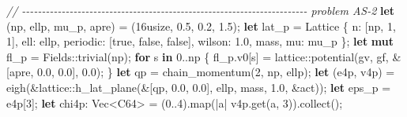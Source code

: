 \documentclass[
  10pt,
]{article}
\newenvironment{Shaded}{}{}
\newcommand{\CommentTok}[1]{\textcolor[rgb]{0.38,0.63,0.69}{\textit{#1}}}
\newcommand{\ConstantTok}[1]{\textcolor[rgb]{0.53,0.00,0.00}{#1}}
\newcommand{\ControlFlowTok}[1]{\textcolor[rgb]{0.00,0.44,0.13}{\textbf{#1}}}
\newcommand{\DataTypeTok}[1]{\textcolor[rgb]{0.56,0.13,0.00}{#1}}
\newcommand{\DecValTok}[1]{\textcolor[rgb]{0.25,0.63,0.44}{#1}}
\newcommand{\KeywordTok}[1]{\textcolor[rgb]{0.00,0.44,0.13}{\textbf{#1}}}
\newcommand{\NormalTok}[1]{#1}
\newcommand{\OperatorTok}[1]{\textcolor[rgb]{0.40,0.40,0.40}{#1}}
\newcommand{\PreprocessorTok}[1]{\textcolor[rgb]{0.74,0.48,0.00}{#1}}
\begin{document}
\begin{Shaded}
\begin{Highlighting}[]
    \CommentTok{// {-}{-}{-}{-}{-}{-}{-}{-}{-}{-}{-}{-}{-}{-}{-}{-}{-}{-}{-}{-}{-}{-}{-}{-}{-}{-}{-}{-}{-}{-}{-}{-}{-}{-}{-}{-}{-}{-}{-}{-}{-}{-}{-}{-}{-}{-}{-}{-}{-}{-}{-}{-}{-}{-}{-}{-}{-}{-}{-}{-}{-}{-}{-}{-}{-}{-}{-}{-}{-}{-}{-}{-} problem AS{-}2}
    \KeywordTok{let}\NormalTok{ (np}\OperatorTok{,}\NormalTok{ ellp}\OperatorTok{,}\NormalTok{ mu\_p}\OperatorTok{,}\NormalTok{ apre) }\OperatorTok{=}\NormalTok{ (}\DecValTok{16usize}\OperatorTok{,} \DecValTok{0.5}\OperatorTok{,} \DecValTok{0.2}\OperatorTok{,} \DecValTok{1.5}\NormalTok{)}\OperatorTok{;}
    \KeywordTok{let}\NormalTok{ lat\_p }\OperatorTok{=}\NormalTok{ Lattice }\OperatorTok{\{}\NormalTok{ n}\OperatorTok{:}\NormalTok{ [np}\OperatorTok{,} \DecValTok{1}\OperatorTok{,} \DecValTok{1}\NormalTok{]}\OperatorTok{,}\NormalTok{ ell}\OperatorTok{:}\NormalTok{ ellp}\OperatorTok{,}\NormalTok{ periodic}\OperatorTok{:}\NormalTok{ [}\ConstantTok{true}\OperatorTok{,} \ConstantTok{false}\OperatorTok{,} \ConstantTok{false}\NormalTok{]}\OperatorTok{,}\NormalTok{ wilson}\OperatorTok{:} \DecValTok{1.0}\OperatorTok{,}\NormalTok{ mass}\OperatorTok{,}\NormalTok{ mu}\OperatorTok{:}\NormalTok{ mu\_p }\OperatorTok{\};}
    \KeywordTok{let} \KeywordTok{mut}\NormalTok{ fl\_p }\OperatorTok{=} \PreprocessorTok{Fields::}\NormalTok{trivial(np)}\OperatorTok{;}
    \ControlFlowTok{for}\NormalTok{ s }\KeywordTok{in} \DecValTok{0}\OperatorTok{..}\NormalTok{np }\OperatorTok{\{}
\NormalTok{        fl\_p}\OperatorTok{.}\NormalTok{v0[s] }\OperatorTok{=} \PreprocessorTok{lattice::}\NormalTok{potential(gv}\OperatorTok{,}\NormalTok{ gf}\OperatorTok{,} \OperatorTok{\&}\NormalTok{[apre}\OperatorTok{,} \DecValTok{0.0}\OperatorTok{,} \DecValTok{0.0}\NormalTok{]}\OperatorTok{,} \DecValTok{0.0}\NormalTok{)}\OperatorTok{;}
    \OperatorTok{\}}
    \KeywordTok{let}\NormalTok{ qp }\OperatorTok{=}\NormalTok{ chain\_momentum(}\DecValTok{2}\OperatorTok{,}\NormalTok{ np}\OperatorTok{,}\NormalTok{ ellp)}\OperatorTok{;}
    \KeywordTok{let}\NormalTok{ (e4p}\OperatorTok{,}\NormalTok{ v4p) }\OperatorTok{=}\NormalTok{ eigh(}\OperatorTok{\&}\PreprocessorTok{lattice::}\NormalTok{h\_lat\_plane(}\OperatorTok{\&}\NormalTok{[qp}\OperatorTok{,} \DecValTok{0.0}\OperatorTok{,} \DecValTok{0.0}\NormalTok{]}\OperatorTok{,}\NormalTok{ ellp}\OperatorTok{,}\NormalTok{ mass}\OperatorTok{,} \DecValTok{1.0}\OperatorTok{,} \OperatorTok{\&}\NormalTok{act))}\OperatorTok{;}
    \KeywordTok{let}\NormalTok{ eps\_p }\OperatorTok{=}\NormalTok{ e4p[}\DecValTok{3}\NormalTok{]}\OperatorTok{;}
    \KeywordTok{let}\NormalTok{ chi4p}\OperatorTok{:} \DataTypeTok{Vec}\OperatorTok{\textless{}}\NormalTok{C64}\OperatorTok{\textgreater{}} \OperatorTok{=}\NormalTok{ (}\DecValTok{0}\OperatorTok{..}\DecValTok{4}\NormalTok{)}\OperatorTok{.}\NormalTok{map(}\OperatorTok{|}\NormalTok{a}\OperatorTok{|}\NormalTok{ v4p}\OperatorTok{.}\NormalTok{get(a}\OperatorTok{,} \DecValTok{3}\NormalTok{))}\OperatorTok{.}\NormalTok{collect()}\OperatorTok{;}

\end{Highlighting}
\end{Shaded}
\end{document}
